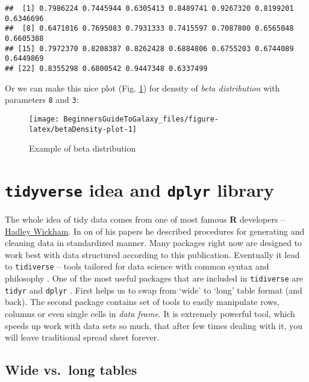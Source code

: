 \documentclass[]{book}
\theoremstyle{definition}
\theoremstyle{definition}
\theoremstyle{definition}
\theoremstyle{remark}
\begin{document}
\begin{verbatim}
##  [1] 0.7986224 0.7445944 0.6305413 0.8489741 0.9267320 0.8199201 0.6346696
##  [8] 0.6471016 0.7695083 0.7931333 0.7415597 0.7087800 0.6565048 0.6605388
## [15] 0.7972370 0.8208387 0.8262428 0.6884806 0.6755203 0.6744089 0.6449869
## [22] 0.8355298 0.6800542 0.9447348 0.6337499
\end{verbatim}

Or we can make this nice plot (Fig. \ref{fig:betaDensity-plot}) for
density of \emph{beta distribution} with parameters \texttt{8} and
\texttt{3}:

\begin{figure}

{\centering \texttt{[image: BeginnersGuideToGalaxy\_files/figure-latex/betaDensity-plot-1]} 

}

\caption{Example of beta distribution}\label{fig:betaDensity-plot}
\end{figure}

\section{\texorpdfstring{\texttt{tidyverse} idea and \texttt{dplyr}
library}{tidyverse idea and dplyr library}}\label{tidyverse-idea-and-dplyr-library}

The whole idea of tidy data comes from one of most famous \textbf{R}
developers -- \href{http://hadley.nz/}{Hadley Wickham}. In on of his
papers \citep{hadley2014} he described procedures for generating and
cleaning data in standardized manner. Many packages right now are
designed to work best with data structured according to this
publication. Eventually it lead to \texttt{tidiverse} -- tools tailored
for data science with common syntax and philosophy \citep{R-tidyverse}.
One of the most useful packages that are included in \texttt{tidiverse}
\citep{R-tidyverse} are \texttt{tidyr} \citep{R-tidyr} and
\texttt{dplyr} \citep{R-dplyr}. First helps us to swap from `wide' to
`long' table format (and back). The second package contains set of tools
to easily manipulate rows, columns or even single cells in \emph{data
frame}. It is extremely powerful tool, which speeds up work with data
sets so much, that after few times dealing with it, you will leave
traditional spread sheet forever.

\subsection{Wide vs.~long tables}\label{wide-vs.long-tables}
\end{document}
